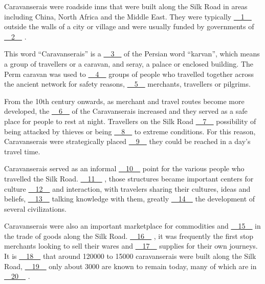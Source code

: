 Caravanserais were roadside inns that were built along the Silk Road in areas including China, North Africa and the Middle East. They were typically \uline{~~1~~} outside the walls of a city or village and were usually funded by governments of \uline{~~2~~} .


This word ``Caravanserais'' is a \uline{~~3~~} of the Persian word ``karvan'', which means a group of travellers or a caravan, and seray, a palace or enclosed building. The Perm caravan was used to \uline{~~4~~} groups of people who travelled together across the ancient network for safety reasons, \uline{~~5~~} merchants, travellers or pilgrims.


From the 10th century onwards, as merchant and travel routes become more developed, the \uline{~~6~~} of the Caravanserais increased and they served as a safe place for people to rest at night. Travellers on the Silk Road \uline{~~7~~} possibility of being attacked by thieves or being \uline{~~8~~} to extreme conditions. For this reason, Caravanserais were strategically placed \uline{~~9~~} they could be reached in a day's travel time.


Caravanserais served as an informal \uline{~~10~~} point for the various people who travelled the Silk Road. \uline{~~11~~} , those structures became important centers for culture \uline{~~12~~} and interaction, with travelers sharing their cultures, ideas and beliefs, \uline{~~13~~} talking knowledge with them, greatly \uline{~~14~~} the development of several civilizations.


Caravanserais were also an important marketplace for commodities and \uline{~~15~~} in the trade of goods along the Silk Road. \uline{~~16~~} , it was frequently the first stop merchants looking to sell their wares and \uline{~~17~~} supplies for their own journeys. It is \uline{~~18~~} that around 120000 to 15000 caravanserais were built along the Silk Road, \uline{~~19~~} only about 3000 are known to remain today, many of which are in \uline{~~20~~} .